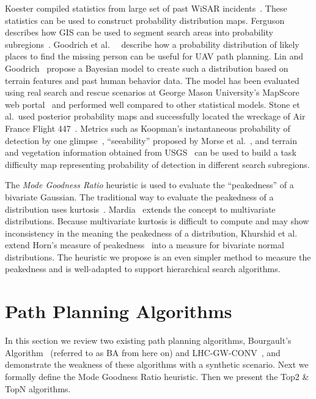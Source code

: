 \documentclass[journal]{IEEEtran}
\begin{document}
Koester compiled statistics from large set of past WiSAR incidents~\cite{koester2008lost}. These statistics can be used to construct probability distribution maps. Ferguson describes how GIS can be used to segment search areas into probability subregions~\cite{Ferguson2008GIS}. Goodrich et al.\ ~\cite{Goodrich2008FieldReport} describe how a probability distribution of likely places to find the missing person can be useful for UAV path planning. Lin and Goodrich~\cite{lin2010bayesian} propose a Bayesian model to create such a distribution based on terrain features and past human behavior data. The model has been evaluated using real search and rescue scenarios at George Mason University's MapScore web portal~\cite{Twardy2012MapScore}
and performed well compared to other statistical models. Stone et al.\ used posterior probability maps and successfully located the wreckage of Air France Flight 447~\cite{stone2011search}. Metrics such as Koopman's instantaneous probability of detection by one glimpse~\cite{koopman1956theory}, ``seeability'' proposed by Morse et al.\ \cite{morse2010uav}, and terrain and vegetation information obtained from USGS~\cite{lin2010bayesian} can be used to build a task difficulty map representing probability of detection in different search subregions.

The \textit{Mode Goodness Ratio} heuristic is used to evaluate the ``peakedness'' of a bivariate Gaussian. The traditional way to evaluate the peakedness of a distribution uses kurtosis~\cite{balanda1988kurtosis}. Mardia~\cite{mardia1970measures} extends the concept to multivariate distributions. Because multivariate kurtosis is difficult to compute and may show inconsistency in the meaning the peakedness
of a distribution, Khurshid et al.\ ~\cite{khurshid2007note} extend Horn's measure of peakedness~\cite{horn1983measure} into a measure for bivariate normal distributions. The heuristic we propose is an even simpler method to measure the peakedness and is well-adapted to support hierarchical search algorithms.

\section{Path Planning Algorithms}
\label{sec:PathPlanningAlgorithms}

In this section we review two existing path planning algorithms, Bourgault's Algorithm~\cite{Bourgault2006} (referred to as BA from here on) and LHC-GW-CONV~\cite{lin2009uav}, and demonstrate the weakness of these algorithms with a synthetic scenario. Next we formally define the Mode Goodness Ratio heuristic. Then we present the Top2 \& TopN algorithms.
\end{document}
